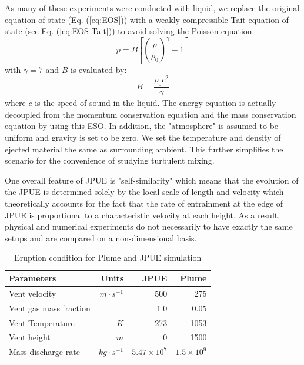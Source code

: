 As many of these experiments were conducted with liquid, we replace the original equation of state (Eq. (\ref{eq:EOS})) with a weakly compressible Tait equation of state \citep {becker2007weakly} (see Eq. (\ref{eq:EOS-Tait})) to avoid solving the Poisson equation.
\begin{equation}
p=B\left[\left(\dfrac{\rho}{\rho_0}\right)^{\gamma}-1\right]
\label{eq:EOS-Tait}
\end{equation}
with $\gamma=7$ and $B$ is evaluated by:
\begin{equation}
B=\dfrac{\rho_0 c^2}{\gamma}
\end{equation}
where $c$ is the speed of sound in the liquid. The energy equation is actually decoupled from the momentum conservation equation and the mass conservation equation by using this ESO. In addition, the "atmosphere" is assumed to be uniform and gravity is set to be zero. We set the temperature and density of ejected material the same as surrounding ambient. This further simplifies the scenario for the convenience of studying turbulent mixing. 

One overall feature of JPUE is "self-similarity" which means that the evolution of the JPUE is determined solely by the local scale of length and velocity which theoretically accounts for the fact that the rate of entrainment at the edge of JPUE is proportional to a characteristic velocity at each height. As a result, physical and numerical experiments do not necessarily to have exactly the same setups and are compared on a non-dimensional basis.

\begin{table}[htp]
\centering
	\begin{centering}
      \caption{Eruption condition for Plume and JPUE simulation}		
	  \begin{tabular}{lrrr}
	    \hline
	    Parameters & Units  & JPUE & Plume \\
	    \hline
	    Vent velocity          & $m\cdot s^{-1}$  & 500               & 275 \\
	    Vent gas mass fraction &                  & 1.0               & 0.05 \\
	    Vent Temperature       & $K$              & 273               & 1053 \\
	    Vent height            & $m$              & 0                 & 1500 \\
	    Mass discharge rate    & $kg\cdot s^{-1}$ & $5.47 \times 10^7$ & $1.5 \times 10^9$\\
	    \hline
	  \end{tabular}
	  \label{tab:input_parameters}
	\end{centering}
\end{table}

